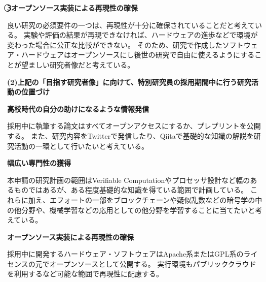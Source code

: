 \noindent\textbf{\textcircled{3}オープンソース実装による再現性の確保}

良い研究の必須要件の一つは、再現性が十分に確保されていることだと考えている。
実験や評価の結果が再現できなければ、ハードウェアの進歩などで環境が変わった場合に公正な比較ができない。
そのため、研究で作成したソフトウェア・ハードウェアはオープンソースにし後世の研究で自由に使えるようにすることが望ましい研究者像だと考えている。



\vspace{5mm}
\noindent
\textbf{(2)上記の「目指す研究者像」に向けて、特別研究員の採用期間中に行う研究活動の位置づけ}

\noindent\textbf{ 高校時代の自分の助けになるような情報発信}

採用中に執筆する論文はすべてオープンアクセスにするか、プレプリントを公開する。
また、研究内容をTwitterで発信したり、Qiitaで基礎的な知識の解説を研究活動の一環として行いたいと考えている。

\noindent\textbf{ 幅広い専門性の獲得}

本申請の研究計画の範囲はVerifiable Computationやプロセッサ設計など幅のあるものではあるが、ある程度基礎的な知識を得ている範囲で計画している。
これらに加え、エフォートの一部をブロックチェーンや疑似乱数などの暗号学の中の他分野や、機械学習などの応用としての他分野を学習することに当てたいと考えている。

\noindent\textbf{ オープンソース実装による再現性の確保}

採用中に開発するハードウェア・ソフトウェアはApache系またはGPL系のライセンスの元でオープンソースとして公開する。
実行環境もパブリッククラウドを利用するなど可能な範囲で再現性に配慮する。







